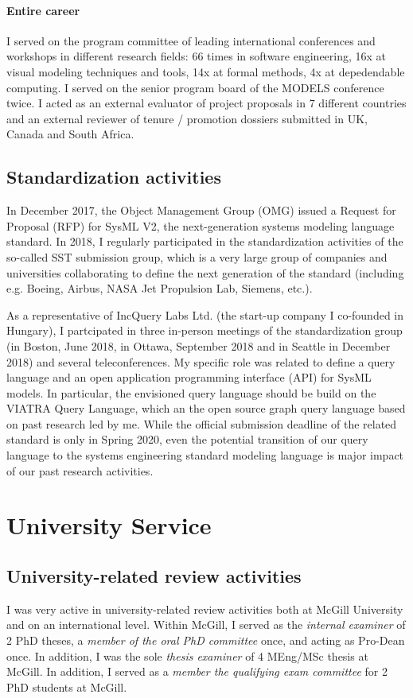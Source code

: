 \paragraph{Entire career}
I served on the program committee of leading international conferences and workshops in different research fields: 66 times in software engineering, 16x at visual modeling techniques and tools, 14x at formal methods, 4x at depedendable computing. I served on the senior program board of the MODELS conference twice. I acted as an external evaluator of project proposals in 7 different countries and an external reviewer of tenure / promotion dossiers submitted in UK, Canada and South Africa. 

\subsection{Standardization activities}
In December 2017, the Object Management Group (OMG) issued a Request for Proposal (RFP) for SysML V2, the next-generation systems modeling language standard. In 2018, I regularly participated in the standardization activities of the so-called SST submission group, which is a very large group of companies and universities collaborating to define the next generation of the standard (including e.g. Boeing, Airbus, NASA Jet Propulsion Lab, Siemens, etc.).

As a representative of IncQuery Labs Ltd. (the start-up company I co-founded in Hungary), I partcipated in three in-person meetings of the standardization group (in Boston, June 2018, in Ottawa, September 2018 and in Seattle in December 2018) and several teleconferences. My specific role was related to define a query language and an open application programming interface (API) for SysML models. In particular, the envisioned query language should be build on the VIATRA Query Language, which an the open source graph query language based on past research led by me. While the official submission deadline of the related standard is only in Spring 2020, even the potential transition of our query language to the systems engineering standard modeling language is major impact of our past research activities. 

\section{University Service}

\subsection{University-related review activities}
I was very active in university-related review activities both at McGill University and on an international level. Within McGill, I served as the \emph{internal examiner} of 2 PhD theses, a \emph{member of the oral PhD committee} once, and acting as Pro-Dean once. In addition, I was the sole \emph{thesis examiner} of 4 MEng/MSc thesis at McGill. In addition, I served as a \emph{member the qualifying exam committee} for 2 PhD students at McGill. 

